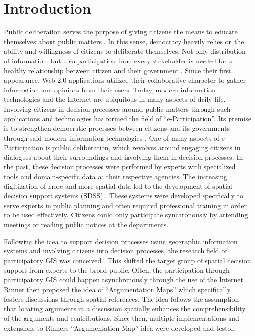 \section{Introduction}
Public deliberation serves the purpose of giving citizens the means to educate themselves about public matters \cite{page1996deliberates}. In this sense, democracy heavily relies on the ability and willingness of citizens to deliberate themselves. Not only distribution of information, but also participation from every stakeholder is needed for a healthy relationship between citizen and their government \cite{Arnstein1969_citizen_participation}.
Since their first appearance, Web 2.0 applications utilized their collaborative character to gather information and opinions from their users. Today, modern information technologies and the Internet are ubiquitous in many aspects of daily life. Involving citizens in decision processes around public matters through such applications and technologies has formed the field of ``e-Participation''. Its premise is to strengthen democratic processes between citizens and its governments through said modern information technologies \cite{Saebo_eParticipation, Medaglia2012_eParticipation}. One of many aspects of e-Participation is public deliberation, which revolves around engaging citizens in dialogues about their surroundings and involving them in decision processes. In the past, these decision processes were performed by experts with specialized tools and domain-specific data at their respective agencies. The increasing digitization of more and more spatial data led to the development of spatial decision support systems (SDSS) \cite{densham_sdss}. These systems were developed specifically to serve experts in public planning and often required professional training in order to be used effectively. Citizens could only participate synchronously by attending meetings or reading public notices at the departments. 

Following the idea to support decision processes using geographic information systems and involving citizens into decision processes, the research field of participatory GIS was conceived \cite{Macintosh2004_eParticipation_characterization,Sieber2006_PublicParticipationGIS}. This shifted the target group of spatial decision support from experts to the broad public. Often, the participation through participatory GIS could happen asynchronously through the use of the Internet. Rinner then proposed the idea of ``Argumentation Maps'' \cite{Rinner_ArgumentationMaps} which specifically fosters discussions through spatial references. The idea follows the assumption that locating arguments in a discussion spatially enhances the comprehensibility of the arguments and contributions. Since then, multiple implementations and extensions to Rinners ``Argumentation Map'' idea were developed and tested. %

